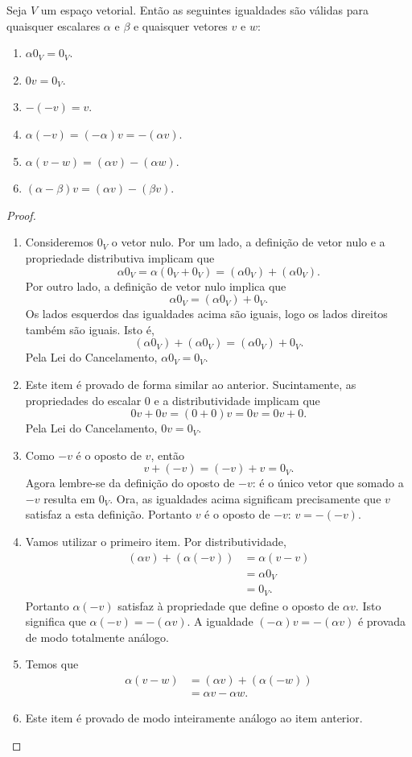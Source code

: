 \begin{theorem}
	Seja $V$ um espaço vetorial. Então as seguintes igualdades são válidas para quaisquer escalares $\alpha$ e $\beta$ e quaisquer vetores $v$ e $w$:
	\begin{enumerate}
		\item $\alpha 0_V=0_V$.
		\item $0v=0_V$.
		\item $-(-v)=v$.
		\item $\alpha(-v)=(-\alpha)v=-(\alpha v)$.
		\item $\alpha(v-w)=(\alpha v)-(\alpha w)$.
		\item $(\alpha-\beta)v=(\alpha v)-(\beta v)$.
	\end{enumerate}
\end{theorem}
\begin{proof}
	\begin{enumerate}
		\item Consideremos $0_V$ o vetor nulo. Por um lado, a definição de vetor nulo e a propriedade distributiva implicam que
		\[\alpha 0_V=\alpha(0_V+0_V)=(\alpha 0_V)+(\alpha 0_V).\]
		Por outro lado, a definição de vetor nulo implica que
		\[\alpha 0_V=(\alpha 0_V)+0_V.\]
		Os lados esquerdos das igualdades acima são iguais, logo os lados direitos também são iguais. Isto é,
		\[(\alpha 0_V)+(\alpha 0_V)=(\alpha 0_V)+0_V.\]
		Pela Lei do Cancelamento, $\alpha 0_V=0_V$.
		\item Este item é provado de forma similar ao anterior. Sucintamente, as propriedades do escalar $0$ e a distributividade implicam que
		\[0v+0v=(0+0)v=0v=0v+0.\]
		Pela Lei do Cancelamento, $0v=0_V$.
		\item Como $-v$ é o oposto de $v$, então
		\[v+(-v)=(-v)+v=0_V.\]
		Agora lembre-se da definição do oposto de $-v$: é o único vetor que somado a $-v$ resulta em $0_V$. Ora, as igualdades acima significam precisamente que $v$ satisfaz a esta definição. Portanto $v$ é o oposto de $-v$: $v=-(-v)$.
		\item Vamos utilizar o primeiro item. Por distributividade,
		\begin{align*}
			(\alpha v)+(\alpha(-v))&=\alpha(v-v)\tag{distributividade}\\
			&=\alpha 0_V\tag{oposto}\\
			&=0_V.\tag{item 1}
		\end{align*}
		Portanto $\alpha(-v)$ satisfaz à propriedade que define o oposto de $\alpha v$. Isto significa que $\alpha(-v)=-(\alpha v)$. A igualdade $(-\alpha)v=-(\alpha v)$ é provada de modo totalmente análogo.
		\item Temos que
		\begin{align*}
			\alpha(v-w)&=(\alpha v)+(\alpha(-w))\tag{distributividade}\\
			&=\alpha v-\alpha w.\tag{item 4}
		\end{align*}
		\item Este item é provado de modo inteiramente análogo ao item anterior.
	\end{enumerate}
\end{proof}
